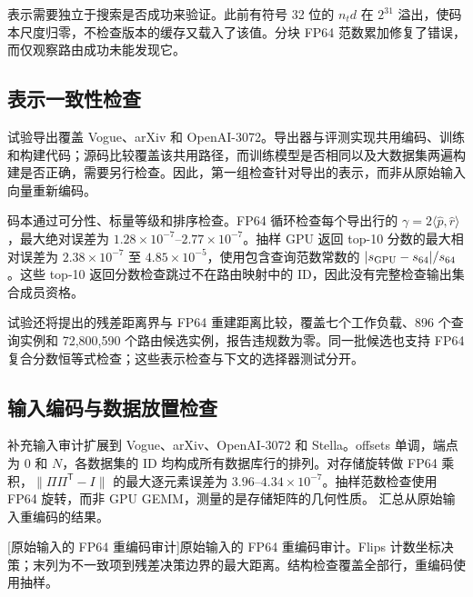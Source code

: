 表示需要独立于搜索是否成功来验证。此前有符号 32 位的 $n_td$ 在 $2^{31}$ 溢出，使码本尺度归零，不检查版本的缓存又载入了该值。分块 FP64 范数累加修复了错误，而仅观察路由成功未能发现它。

\subsection{表示一致性检查}

试验导出覆盖 Vogue、arXiv 和 OpenAI-3072。导出器与评测实现共用编码、训练和构建代码；源码比较覆盖该共用路径，而训练模型是否相同以及大数据集两遍构建是否正确，需要另行检查。因此，第一组检查针对导出的表示，而非从原始输入向量重新编码。

码本通过可分性、标量等级和排序检查。FP64 循环检查每个导出行的 $\gamma=2\langle\widehat p,\widehat r\rangle$，最大绝对误差为 $1.28\times10^{-7}$--$2.77\times10^{-7}$。抽样 GPU 返回 top-10 分数的最大相对误差为 $2.38\times10^{-7}$ 至 $4.85\times10^{-5}$，使用包含查询范数常数的 $|s_{\rm GPU}-s_{64}|/s_{64}$。这些 top-10 返回分数检查跳过不在路由映射中的 ID，因此没有完整检查输出集合成员资格。

试验还将提出的残差距离界与 FP64 重建距离比较，覆盖七个工作负载、896 个查询实例和 72,800,590 个路由候选实例，报告违规数为零。同一批候选也支持 FP64 复合分数恒等式检查；这些表示检查与下文的选择器测试分开。

\subsection{输入编码与数据放置检查}
\label{sec:4-representation-audit}

补充输入审计扩展到 Vogue、arXiv、OpenAI-3072 和 Stella。offsets 单调，端点为 0 和 $N$，各数据集的 ID 均构成所有数据库行的排列。对存储旋转做 FP64 乘积，$\|\Pi\Pi^{\mathsf T}-I\|$ 的最大逐元素误差为 $3.96$--$4.34\times10^{-7}$。抽样范数检查使用 FP64 旋转，而非 GPU GEMM，测量的是存储矩阵的几何性质。 汇总从原始输入重编码的结果。

\par\medskip\noindent\begin{minipage}{\linewidth}
\centering\captionsetup{hypcap=false}
[原始输入的 FP64 重编码审计]{原始输入的 FP64 重编码审计。Flips 计数坐标决策；末列为不一致项到残差决策边界的最大距离。结构检查覆盖全部行，重编码使用抽样。}
\label{tab:4-representation-audit}
\scriptsize\setlength{\tabcolsep}{3pt}

\end{minipage}\par\medskip

